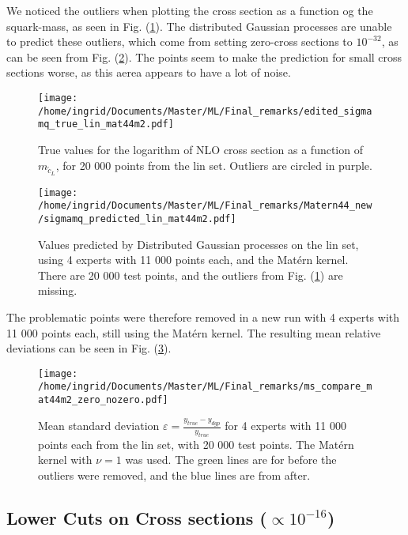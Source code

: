 \documentclass[twoside,english]{uiofysmaster}
\begin{document}
We noticed the outliers when plotting the cross section as a function og the squark-mass, as seen in Fig. (\ref{Fig:: sigma mq true with outliers}). The distributed Gaussian processes are unable to predict these outliers, which come from setting zero-cross sections to $10^{-32}$, as can be seen from Fig. (\ref{Fig:: sigma mq predicted mat44m2_new}). The points seem to make the prediction for small cross sections worse, as this aerea appears to have a lot of noise. 

\begin{figure}[H]
\centering
\texttt{[image: /home/ingrid/Documents/Master/ML/Final\_remarks/edited\_sigmamq\_true\_lin\_mat44m2.pdf]}
\caption{True values for the logarithm of NLO cross section as a function of $m_{\tilde{c}_L}$, for 20 000 points from the lin set. Outliers are circled in purple.}
\label{Fig:: sigma mq true with outliers}
\end{figure}

\begin{figure}[H]
\centering
\texttt{[image: /home/ingrid/Documents/Master/ML/Final\_remarks/Matern44\_new/sigmamq\_predicted\_lin\_mat44m2.pdf]}
\caption{Values predicted by Distributed Gaussian processes on the lin set, using 4 experts with 11 000 points each, and the Mat\'{e}rn kernel. There are 20 000 test points, and the outliers from Fig. (\ref{Fig:: sigma mq true with outliers}) are missing.}
\label{Fig:: sigma mq predicted mat44m2_new}
\end{figure}

The problematic points were therefore removed in a new run with 4 experts with 11 000 points each, still using the Mat\'{e}rn kernel. The resulting mean relative deviations can be seen in Fig. (\ref{Fig:: ms mat44m2 zeros nozeros}).

\begin{figure}[H]
\centering
\texttt{[image: /home/ingrid/Documents/Master/ML/Final\_remarks/ms\_compare\_mat44m2\_zero\_nozero.pdf]}
\caption{Mean standard deviation $\varepsilon = \frac{y_{true} - y_{dgp}}{y_{true}}$ for 4 experts with 11 000 points each from the lin set, with 20 000 test points. The Mat\'{e}rn kernel with $\nu = 1$ was used. The green lines are for before the outliers were removed, and the blue lines are from after.}
\label{Fig:: ms mat44m2 zeros nozeros}
\end{figure}



\subsection{Lower Cuts on Cross sections ($\propto 10^{-16}$)}
\end{document}
